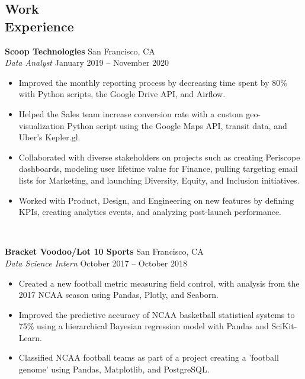 \documentclass[line, margin]{res}
\begin{document}
\begin{resume}
\section{Work\\Experience}
	\textbf{Scoop Technologies} \hfill{San Francisco, CA} \vspace{1 mm}\\\vspace{0.5mm}%
	\textsl{Data Analyst} \hfill{January 2019 -- November 2020}\
	\begin{itemize}
		\item Improved the monthly reporting process by decreasing time spent by 80\% with Python scripts, the Google Drive API, and Airflow.
		\item Helped the Sales team increase conversion rate with a custom geo-visualization Python script using the Google Maps API, transit data, and Uber's Kepler.gl.
		\item Collaborated with diverse stakeholders on projects such as creating Periscope dashboards, modeling user lifetime value for Finance, pulling targeting email lists for Marketing, and launching Diversity, Equity, and Inclusion initiatives.
		\item Worked with Product, Design, and Engineering on new features by defining KPIs, creating analytics events, and analyzing post-launch performance.
	\end{itemize}\
	
	\textbf{Bracket Voodoo/Lot 10 Sports} \hfill{San Francisco, CA} \vspace{1mm}\\\vspace{0.5mm}%
	\textsl{Data Science Intern} \hfill {October 2017 -- October 2018}\
	\begin{itemize}
		\item Created a new football metric measuring field control, with analysis from the 2017 NCAA season using Pandas, Plotly, and Seaborn.
		\item Improved the predictive accuracy of NCAA basketball statistical systems to 75\% using a hierarchical Bayesian regression model with Pandas and SciKit-Learn.
		\item Classified NCAA football teams as part of a project creating a 'football genome' using Pandas, Matplotlib, and PostgreSQL.
	\end{itemize}\


\end{resume}
\end{document}
